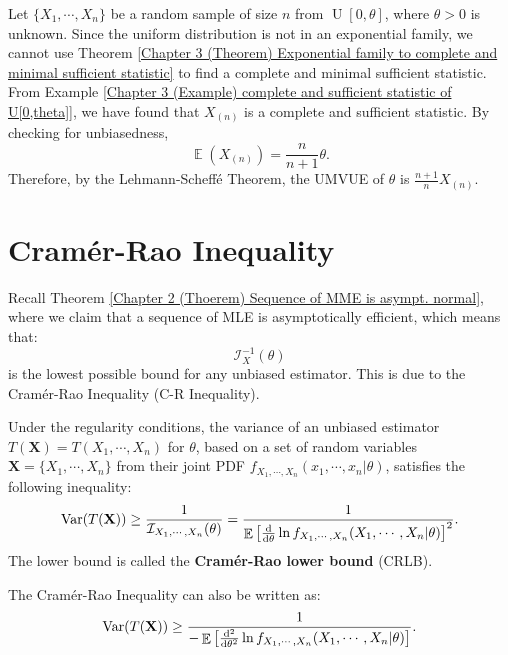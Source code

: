 \documentclass{huhtakm-template-book-v2}
\DeclareMathOperator{\E}{\mathbb{E}}
\DeclareMathOperator{\Var}{Var}
\DeclareMathOperator{\U}{U}
\begin{document}
    \begin{eg}
        Let $\{X_{1},\cdots,X_{n}\}$ be a random sample of size $n$ from $\U[0,\theta]$, where $\theta>0$ is unknown. Since the uniform distribution is not in an exponential family, we cannot use Theorem \ref{Chapter 3 (Theorem) Exponential family to complete and minimal sufficient statistic} to find a complete and minimal sufficient statistic.\\
        From Example \ref{Chapter 3 (Example) complete and sufficient statistic of U[0,theta]}, we have found that $X_{(n)}$ is a complete and sufficient statistic. By checking for unbiasedness,
        \begin{equation*}
            \E(X_{(n)})=\frac{n}{n+1}\theta.
        \end{equation*}
        Therefore, by the Lehmann-Scheff\'e Theorem, the UMVUE of $\theta$ is $\frac{n+1}{n}X_{(n)}$.
    \end{eg}

\section{Cram\'er-Rao Inequality}
    Recall Theorem \ref{Chapter 2 (Thoerem) Sequence of MME is asympt. normal}, where we claim that a sequence of MLE is asymptotically efficient, which means that:
    \begin{equation*}
        \mathcal{I}_{X}^{-1}(\theta)
    \end{equation*}
    is the lowest possible bound for any unbiased estimator. This is due to the Cram\'er-Rao Inequality (C-R Inequality).
    \begin{thm}
        Under the regularity conditions, the variance of an unbiased estimator $T(\mathbf{X})=T(X_{1},\cdots,X_{n})$ for $\theta$, based on a set of random variables $\mathbf{X}=\{X_{1},\cdots,X_{n}\}$ from their joint PDF $f_{X_{1},\cdots,X_{n}}(x_{1},\cdots,x_{n}|\theta)$, satisfies the following inequality:
        \begin{equation*}
            \Var(T(\mathbf{X}))\geq\frac{1}{\mathcal{I}_{X_{1},\cdots,X_{n}}(\theta)}=\frac{1}{\E\left[\odv*{\ln{f_{X_{1},\cdots,X_{n}}(X_{1},\cdots,X_{n}|\theta)}}{\theta}\right]^{2}}.
        \end{equation*}
        The lower bound is called the \textbf{Cram\'er-Rao lower bound} (CRLB).
    \end{thm}
    \begin{rem}
        The Cram\'er-Rao Inequality can also be written as:
        \begin{equation*}
            \Var(T(\mathbf{X}))\geq\frac{1}{-\E\left[\odv*[order={2}]{\ln{f_{X_{1},\cdots,X_{n}}(X_{1},\cdots,X_{n}|\theta)}}{\theta}\right]}.
        \end{equation*}
    \end{rem}
    \newpage
    
\end{document}
